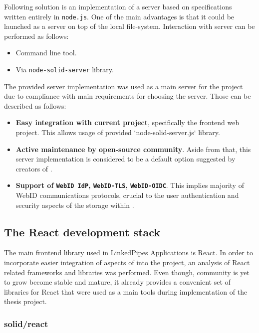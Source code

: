 Following solution is an implementation of a server based on \solid{} specifications written entirely in \texttt{node.js}.
One of the main advantages is that it could be launched as a \solid{} server on top of the local file-system. Interaction with server can be performed as follows:
\begin{itemize}
	\item Command line tool.
    \item Via \texttt{node-solid-server} library.
\end{itemize}

The provided server implementation was used as a main \solid{} server for the project due to compliance with main requirements for choosing the server. Those can be described as follows:
\begin{itemize}
	\item \textbf{Easy integration with current \lpa{} project}, specifically the frontend web project. This allows usage of provided `node-solid-server.js` library.
    \item \textbf{Active maintenance by open-source community}. Aside from that, this server implementation is considered to be a default option suggested by creators of \solid{}.
    \item \textbf{Support of \texttt{WebID IdP}, \texttt{WebID-TLS}, \texttt{WebID-OIDC}}. This implies majority of WebID communications protocols,
    crucial to the user authentication and security aspects of the storage within \lpa{}.
\end{itemize}


\subsection{The \solid{} React development stack}

The main frontend library used in LinkedPipes Applications is React. In order to incorporate easier integration of aspects of \solid{} into the project, an analysis of React related \solid{} frameworks and libraries was performed. Even though, \solid{} community is yet to grow become stable and mature, it already provides a convenient set of libraries for React that were used as a main tools during implementation of the thesis project. 

\subsubsection{solid/react}

